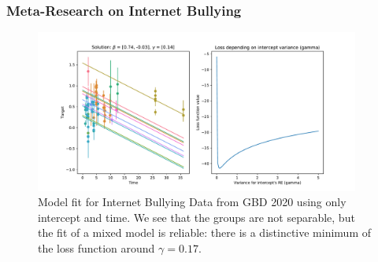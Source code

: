 \documentclass[11pt,letterpaper]{article}
\numberwithin{equation}{section} %
\numberwithin{figure}{section} %
\numberwithin{table}{section} %
\begin{document}
\subsubsection{Meta-Research on Internet Bullying} 
\label{ch:bullying}
\begin{figure}
	\includegraphics[width=0.95\textwidth]{Images/bullying_data.csv_intercept_only}
	\caption{\label{fig:bullying_data_intercept_only}Model fit for Internet Bullying Data from GBD 2020 using only intercept and time. We see that the groups are not separable, but the fit of a mixed model is reliable: there is a distinctive minimum of the loss function around $\gamma=0.17$.}
\end{figure}
\end{document}
